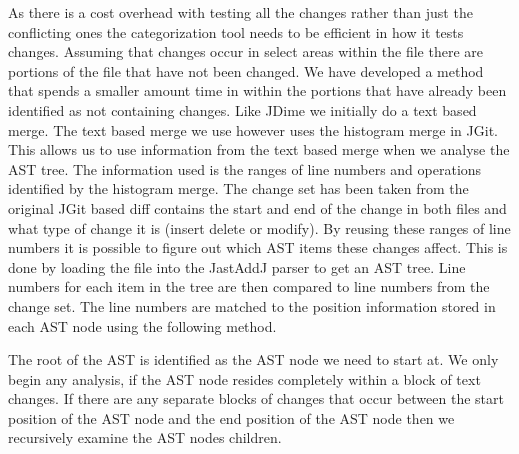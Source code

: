 As there is a cost overhead with testing all the changes rather than just the conflicting ones the categorization tool needs to be efficient in how it tests changes.  Assuming that changes occur in select areas within the file there are portions of the file that have not been changed.  We have developed a method that spends a smaller amount time in  within the portions that have already been identified as not containing changes.  Like JDime we initially do a text based merge.  The text based merge we use however uses the histogram merge in JGit.  This allows us to use information from the text based merge when we analyse the AST tree.  The information used is the ranges of line numbers and operations identified by the histogram merge. The change set has been taken from the original JGit based diff contains the start and end of the change in both files and what type of change it is (insert delete or modify).  By reusing these ranges of line numbers it is possible to figure out which AST items these changes affect. This is done by loading the file into the JastAddJ parser to get an AST tree. Line numbers for each item in the tree are then compared to line numbers from the change set. The line numbers are matched to the position information stored in each AST node using the following method.

The root of the AST is identified as the AST node we need to start at. 
We only begin any analysis, if the AST node resides completely within a block of text changes.
If there are any separate blocks of changes that occur between the start position of the AST node and the end position of the AST node then we recursively examine the AST nodes children.

% 
% 


